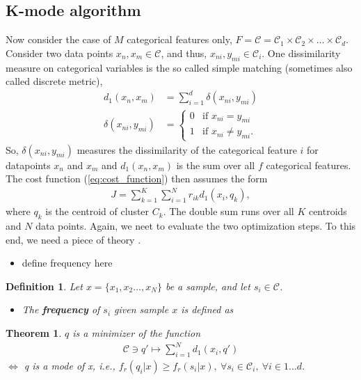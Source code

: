 \documentclass[10pt,a4paper]{article}
\newtheorem{theorem}{Theorem}
\newtheorem{definition}{Definition}
\begin{document}
\subsection{K-mode algorithm}
Now consider the case of $M$ categorical features only, $F = \mathcal C = \mathcal C_1 \times \mathcal C_2 \times \dots \times \mathcal C_d$. Consider two data points $x_n,x_m  \in \mathcal C$, and thus, $x_{ni},y_{mi}  \in \mathcal C_i$.
One dissimilarity measure on categorical variables is the so called simple matching \cite{Huang:1998, Huang97clusteringlarge} (sometimes also called discrete metric),
\begin{align}
d_1(x_n,x_m) &= \sum_{i=1}^d \delta(x_{ni}, y_{mi}) \\
\delta(x_{ni}, y_{mi}) &= \begin{cases} \label{eq:disc_metric}
0 & \text{if } x_{ni}=y_{mi} \\
1 & \text{if } x_{ni} \neq y_{mi}.
\end{cases}
\end{align}
So, $\delta(x_{ni}, y_{mi})$ measures the dissimilarity of the categorical feature $i$ for datapoints $x_n$ and $x_m$ and $d_1(x_n,x_m)$ is the sum over all $f$ categorical features. 
The cost function (\ref{eq:cost_function}) then assumes the form
\begin{align}  \label{eq:cost_function_modes}
J = \sum _{k=1}^K \sum_{i=1} ^ N  r_{ik} d_1(x_i, q_k),
\end{align} 
where $q_k$ is the centroid of cluster $C_k$. The double sum runs over all $K$ centroids and $N$ data points.
Again, we neet to evaluate the two optimization steps. To this end, we need a piece of theory \cite{Huang:1998}.
\begin{itemize}
\item define frequency here 
\end{itemize}
\begin{definition}
Let $x = \{x_1, x_2 \dots, x_N \}$ be a sample, and let $s_i \in \mathcal  C$.
\begin{itemize} 
\item The \textbf{frequency} of $s_i$ given sample $x$ is defined as 
\end{itemize}
\end{definition}
\begin{theorem}
$q$ is a minimizer of the function
\begin{align} \label{eq:minimizer_cat}
\mathcal C \owns q' \mapsto \sum_{i=1} ^ N   d_1(x_i, q')
\end{align}
$\Leftrightarrow$ q is a mode of x, i.e., $f_r(q_{i} | x) \geq f_r(s_i | x), ~\forall s_i \in  \mathcal C_i, ~ \forall i \in 1 \dots d$.
\end{theorem}
\end{document}
